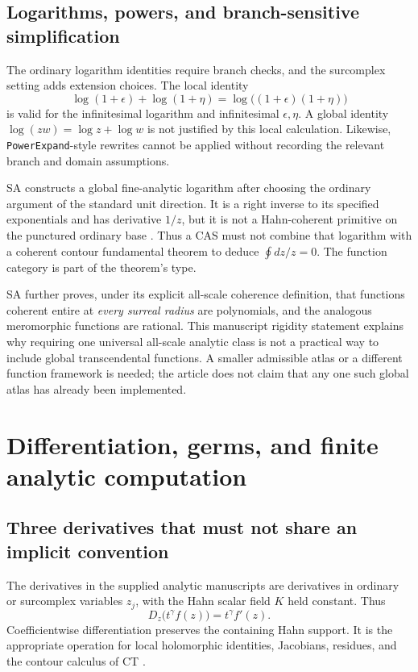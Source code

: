 \documentclass[11pt,letterpaper]{article}
\theoremstyle{definition}\newtheorem{definition}[theorem]{Definition}
\theoremstyle{remark}\newtheorem{remark}[theorem]{Remark}
\newcommand{\code}[1]{\texttt{#1}}
\numberwithin{equation}{section}\setcounter{tocdepth}{2}
\begin{document}
\subsection{Logarithms, powers, and branch-sensitive simplification}
The ordinary logarithm identities require branch checks, and the surcomplex setting adds extension choices. The local identity
\[
 \log(1+\epsilon)+\log(1+\eta)
 =\log\bigl((1+\epsilon)(1+\eta)\bigr)
\]
is valid for the infinitesimal logarithm and infinitesimal $\epsilon,\eta$. A global identity $\log(zw)=\log z+\log w$ is not justified by this local calculation. Likewise, \code{PowerExpand}-style rewrites cannot be applied without recording the relevant branch and domain assumptions.

SA constructs a global fine-analytic logarithm after choosing the ordinary argument of the standard unit direction. It is a right inverse to its specified exponentials and has derivative $1/z$, but it is not a Hahn-coherent primitive on the punctured ordinary base \cite{SA}. Thus a CAS must not combine that logarithm with a coherent contour fundamental theorem to deduce $\oint dz/z=0$. The function category is part of the theorem's type.

SA further proves, under its explicit all-scale coherence definition, that functions coherent entire at \emph{every surreal radius} are polynomials, and the analogous meromorphic functions are rational. This manuscript rigidity statement explains why requiring one universal all-scale analytic class is not a practical way to include global transcendental functions. A smaller admissible atlas or a different function framework is needed; the article does not claim that any one such global atlas has already been implemented.

\section{Differentiation, germs, and finite analytic computation}\label{sec:germs}
\subsection{Three derivatives that must not share an implicit convention}
The derivatives in the supplied analytic manuscripts are derivatives in ordinary or surcomplex variables $z_j$, with the Hahn scalar field $K$ held constant. Thus
\[
 D_z\bigl(t^\gamma f(z)\bigr)=t^\gamma f'(z).
\]
Coefficientwise differentiation preserves the containing Hahn support. It is the appropriate operation for local holomorphic identities, Jacobians, residues, and the contour calculus of CT \cite{SA,AG,CT}.
\end{document}
